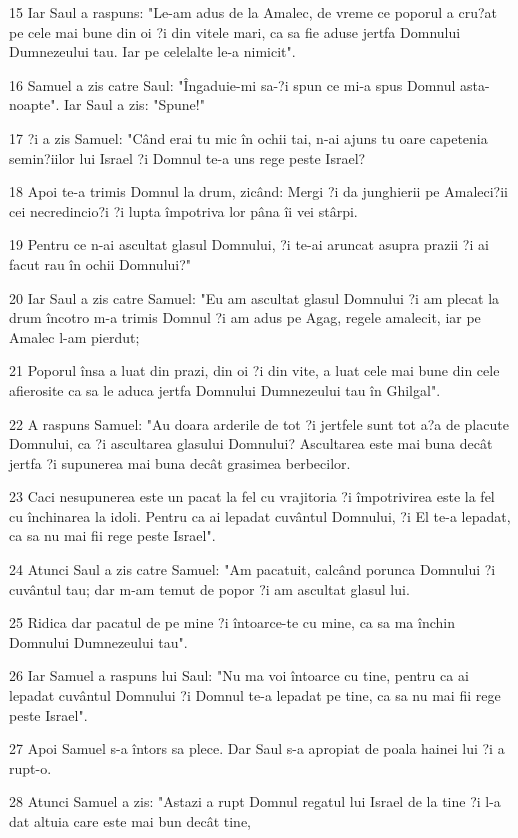 \par 15 Iar Saul a raspuns: "Le-am adus de la Amalec, de vreme ce poporul a cru?at pe cele mai bune din oi ?i din vitele mari, ca sa fie aduse jertfa Domnului Dumnezeului tau. Iar pe celelalte le-a nimicit".
\par 16 Samuel a zis catre Saul: "Îngaduie-mi sa-?i spun ce mi-a spus Domnul asta-noapte". Iar Saul a zis: "Spune!"
\par 17 ?i a zis Samuel: "Când erai tu mic în ochii tai, n-ai ajuns tu oare capetenia semin?iilor lui Israel ?i Domnul te-a uns rege peste Israel?
\par 18 Apoi te-a trimis Domnul la drum, zicând: Mergi ?i da junghierii pe Amaleci?ii cei necredincio?i ?i lupta împotriva lor pâna îi vei stârpi.
\par 19 Pentru ce n-ai ascultat glasul Domnului, ?i te-ai aruncat asupra prazii ?i ai facut rau în ochii Domnului?"
\par 20 Iar Saul a zis catre Samuel: "Eu am ascultat glasul Domnului ?i am plecat la drum încotro m-a trimis Domnul ?i am adus pe Agag, regele amalecit, iar pe Amalec l-am pierdut;
\par 21 Poporul însa a luat din prazi, din oi ?i din vite, a luat cele mai bune din cele afierosite ca sa le aduca jertfa Domnului Dumnezeului tau în Ghilgal".
\par 22 A raspuns Samuel: "Au doara arderile de tot ?i jertfele sunt tot a?a de placute Domnului, ca ?i ascultarea glasului Domnului? Ascultarea este mai buna decât jertfa ?i supunerea mai buna decât grasimea berbecilor.
\par 23 Caci nesupunerea este un pacat la fel cu vrajitoria ?i împotrivirea este la fel cu închinarea la idoli. Pentru ca ai lepadat cuvântul Domnului, ?i El te-a lepadat, ca sa nu mai fii rege peste Israel".
\par 24 Atunci Saul a zis catre Samuel: "Am pacatuit, calcând porunca Domnului ?i cuvântul tau; dar m-am temut de popor ?i am ascultat glasul lui.
\par 25 Ridica dar pacatul de pe mine ?i întoarce-te cu mine, ca sa ma închin Domnului Dumnezeului tau".
\par 26 Iar Samuel a raspuns lui Saul: "Nu ma voi întoarce cu tine, pentru ca ai lepadat cuvântul Domnului ?i Domnul te-a lepadat pe tine, ca sa nu mai fii rege peste Israel".
\par 27 Apoi Samuel s-a întors sa plece. Dar Saul s-a apropiat de poala hainei lui ?i a rupt-o.
\par 28 Atunci Samuel a zis: "Astazi a rupt Domnul regatul lui Israel de la tine ?i l-a dat altuia care este mai bun decât tine,
